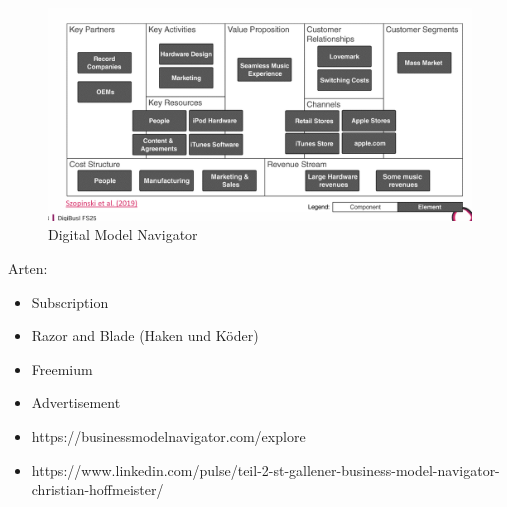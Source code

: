 \documentclass[../Main.tex]{subfiles}
\begin{document}
\begin{figure}[H]
    \centering
    \includegraphics[width=1\linewidth]{Images/digbus/modeldesignexample.png}
    \caption{Digital Model Navigator}
\end{figure}

Arten:
\begin{itemize}
    \item Subscription
    \item Razor and Blade (Haken und Köder)
    \item Freemium
    \item Advertisement
    \item https://businessmodelnavigator.com/explore
    \item https://www.linkedin.com/pulse/teil-2-st-gallener-business-model-navigator-christian-hoffmeister/
\end{itemize}
\end{document}

